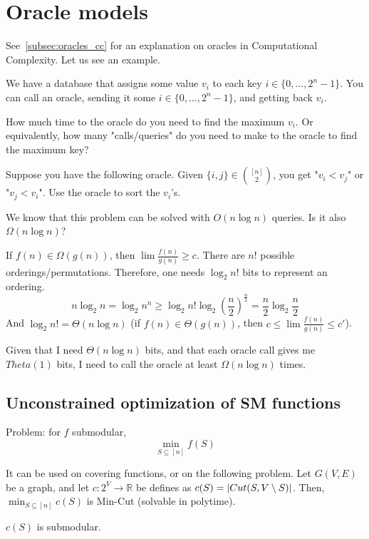 \section{Oracle models}

See~\ref{subsec:oracles_cc} for an explanation on oracles in Computational Complexity.
Let us see an example.

We have a database that assigns some value $v_i$ to each key $i \in \{ 0, \dots, 2^n-1 \}$.
You can call an oracle, sending it some $i \in \{ 0, \dots, 2^n-1 \}$, and getting back $v_i$.

How much time to the oracle do you need to find the maximum $v_i$.
Or equivalently, how many "calls/queries" do you need to make to the oracle to find the maximum key?

Suppose you have the following oracle.
Given $\{ i,j \} \in \binom{[n]}{2}$, you get "$v_i < v_j$" or "$v_j < v_i$".
Use the oracle to sort the $v_i$'s.

We know that this problem can be solved with $O(n \log n)$ queries.
Is it also $\Omega(n \log n)$?

If $f(n) \in \Omega(g(n))$, then $\lim \frac{f(n)}{g(n)} \geq c$.
There are $n!$ possible orderings/permutations.
Therefore, one needs $\log_2 n!$ bits to represent an ordering.
\[ n \log_2 n = \log_2 n^n \geq \log_2 n! \log_2 (\frac{n}{2})^{\frac{n}{2}} = \frac{n}{2} \log_2 \frac{n}{2} \]
And $\log_2 n! = \Theta(n \log n)$ (if $f(n) \in \Theta(g(n))$, then $c \leq \lim \frac{f(n)}{g(n)} \leq c'$).

Given that I need $\Theta(n \log n)$ bits, and that each oracle call gives me $Theta(1)$ bits, I need to call the oracle at least $\Omega(n \log n)$ times.


\subsection{Unconstrained optimization of SM functions}
    Problem: for $f$ submodular,
    \[ \min_{S \subseteq [n]} f(S) \]

    It can be used on covering functions, or on the following problem.
    Let $G(V,E)$ be a graph, and let $c : 2^V \rightarrow \mathbb{R}$ be defines as $c(S) = \vert Cut(S, V \setminus S) \vert$. Then, $\min_{S \subseteq [n]} c(S)$ is Min-Cut (solvable in polytime).

    \begin{lemma}
        $c(S)$ is submodular.
    \end{lemma}

